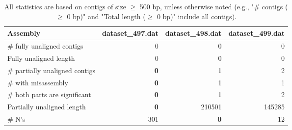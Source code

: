 \documentclass[12pt,a4paper]{article}
\begin{document}
\begin{table}[ht]
\begin{center}
\caption{All statistics are based on contigs of size $\geq$ 500 bp, unless otherwise noted (e.g., "\# contigs ($\geq$ 0 bp)" and "Total length ($\geq$ 0 bp)" include all contigs).}
\begin{tabular}{|l*{3}{|r}|}
\hline
Assembly & dataset\_497.dat & dataset\_498.dat & dataset\_499.dat \\ \hline
\# fully unaligned contigs & 0 & 0 & 0 \\ \hline
Fully unaligned length & 0 & 0 & 0 \\ \hline
\# partially unaligned contigs & {\bf 0} & 1 & 2 \\ \hline
\hspace{5mm}\# with misassembly & {\bf 0} & 1 & 1 \\ \hline
\hspace{5mm}\# both parts are significant & {\bf 0} & 1 & 2 \\ \hline
Partially unaligned length & {\bf 0} & 210501 & 145285 \\ \hline
\# N's & 301 & {\bf 0} & 12 \\ \hline
\end{tabular}
\end{center}
\end{table}
\end{document}

